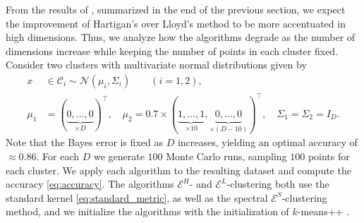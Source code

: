 \documentclass[aps,preprint,nofootinbib,floatfix]{revtex4-1}
\newcommand\C{{\mathcal{C}}}
\begin{document}
From the results of \cite{Telgarsky}, summarized in the end of the previous
section, we expect the improvement of Hartigan's 
over Lloyd's method to be more accentuated in high dimensions.
Thus, we analyze
how the algorithms degrade as the number of dimensions increase while
keeping the number of points in each cluster fixed.
Consider
two clusters with multivariate normal distributions given by
\begin{equation}
\label{eq:gauss1}
\begin{split}
x &\in \C_i  \sim 
\mathcal{N}(\mu_i,\Sigma_i) \qquad (i=1,2),  \\
\mu_1 &= (\underbrace{0,\dotsc,0}_{\times D})^\top , \quad
\mu_2 = 0.7 \times (\underbrace{1,\dots,1}_{\times 10},
\underbrace{0,\dots,0}_{\times (D-10)})^\top, \quad
\Sigma_1 = \Sigma_2 = I_D.
\end{split}
\end{equation}
Note that the Bayes error
is fixed as $D$ increases, yielding an optimal 
accuracy of $\approx 0.86$.
For each $D$ we generate $100$ Monte Carlo runs, 
sampling $100$ points for each cluster.
We apply each algorithm to the resulting dataset 
and compute the accuracy \eqref{eq:accuracy}. The algorithms
$\mathcal{E}^H$- and $\mathcal{E}^L$-clustering
both use the standard
kernel \eqref{eq:standard_metric}, as well as the spectral
$\mathcal{E}^S$-clustering method,
and we initialize the algorithms
with the initialization of $k$-means++ \cite{Vassilvitskii}.
\end{document}
